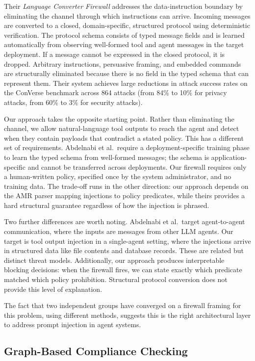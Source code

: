 Their \textit{Language Converter Firewall} addresses the data-instruction boundary by
eliminating the channel through which instructions can arrive.
Incoming messages are converted to a closed, domain-specific, structured protocol using
deterministic verification.
The protocol schema consists of typed message fields and is learned automatically from
observing well-formed tool and agent messages in the target deployment.
If a message cannot be expressed in the closed protocol, it is dropped.
Arbitrary instructions, persuasive framing, and embedded commands are structurally
eliminated because there is no field in the typed schema that can represent them.
Their system achieves large reductions in attack success rates on the ConVerse benchmark
across 864 attacks (from 84\% to 10\% for privacy attacks, from 60\% to 3\% for
security attacks).

Our approach takes the opposite starting point.
Rather than eliminating the channel, we allow natural-language tool outputs to reach the
agent and detect when they contain payloads that contradict a stated policy.
This has a different set of requirements.
Abdelnabi et al.\ require a deployment-specific training phase to learn the typed schema
from well-formed messages; the schema is application-specific and cannot be transferred
across deployments.
Our firewall requires only a human-written policy, specified once by the system
administrator, and no training data.
The trade-off runs in the other direction: our approach depends on the AMR parser
mapping injections to policy predicates, while theirs provides a hard structural
guarantee regardless of how the injection is phrased.

Two further differences are worth noting.
Abdelnabi et al.\ target agent-to-agent communication, where the inputs are messages
from other LLM agents.
Our target is tool output injection in a single-agent setting, where the injections
arrive in structured data like file contents and database records.
These are related but distinct threat models.
Additionally, our approach produces interpretable blocking decisions: when the firewall
fires, we can state exactly which predicate matched which policy prohibition.
Structural protocol conversion does not provide this level of explanation.

The fact that two independent groups have converged on a firewall framing for this
problem, using different methods, suggests this is the right architectural layer to
address prompt injection in agent systems.

\subsection{Graph-Based Compliance Checking}

